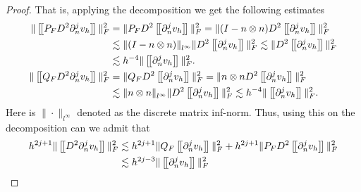 \begin{proof}
        That is, applying the decomposition we get the following estimates
        \begin{align}
            \| \jump{ P_{F}   D^2 \partial _{n}^{j} v_{h} }\|_{ F }^{ 2 } & = \| P_{F} D^2 \jump{ \partial _{n}^{j} v_{h} }   \|_{ F  }^{ 2} = \| (I- n\otimes n) D^2 \jump{ \partial _{n}^{j} v_{h} }   \|_{ F  }^{ 2}    \\
                                                                          & \lesssim  \|  (I- n\otimes n) \|_{l^{\infty} }^{  } \| D^2 \jump{ \partial _{n}^{j} v_{h} }   \|_{ F  }^{ 2} \lesssim   \|  D^2 \jump{ \partial _{n}^{j} v_{h} }   \|_{ F  }^{
                                                                          2} \\
                                                                          & \lesssim h^{-4} \|  \jump{ \partial ^{j}_{n} v_{h} }   \|_{ F }^{  2}. \\
            \| \jump{ Q_{F}   D^2 \partial _{n}^{j} v_{h} }\|_{ F }^{ 2 } & = \| Q_{F} D^2 \jump{ \partial _{n}^{j} v_{h} }   \|_{ F  }^{ 2} = \| n\otimes n D^2 \jump{ \partial _{n}^{j} v_{h} }   \|_{ F  }^{ 2}    \\
                                                                          & \lesssim  \| n \otimes n \|_{l^{\infty} }^{  }  \|  D^2 \jump{ \partial _{n}^{j} v_{h} }   \|_{ F  }^{ 2} \lesssim h^{-4} \|  \jump{ \partial ^{j}_{n} v_{h} }   \|_{ F }^{  2}.
        \end{align}
        Here is $\| \cdot  \|_{l^{\infty}  }^{  } $ denoted as the discrete matrix inf-norm.
        Thus, using this on the decomposition can we admit that
        \begin{equation}
             \begin{split}
            h^{2j +1} \| \jump{D^2 \partial ^{j}_{n}  v_{h}}  \|_{ F }^{2  } & \lesssim h^{2j +1} \| Q_{F} \jump{ \partial ^{j}_{n}  v_{h} }  \|_{ F }^{2  } + h^{2j +1} \| P_{F} D^2 \jump{ \partial ^{j}_{n}  v_{h} }       \|_{ F }^{2  } \\
            &  \lesssim   h^{2j -3}  \| \jump{ \partial ^{j}_{n}v_{h} }   \|_{ F }^{ 2 }
             \end{split}
        \end{equation}


\end{proof}
